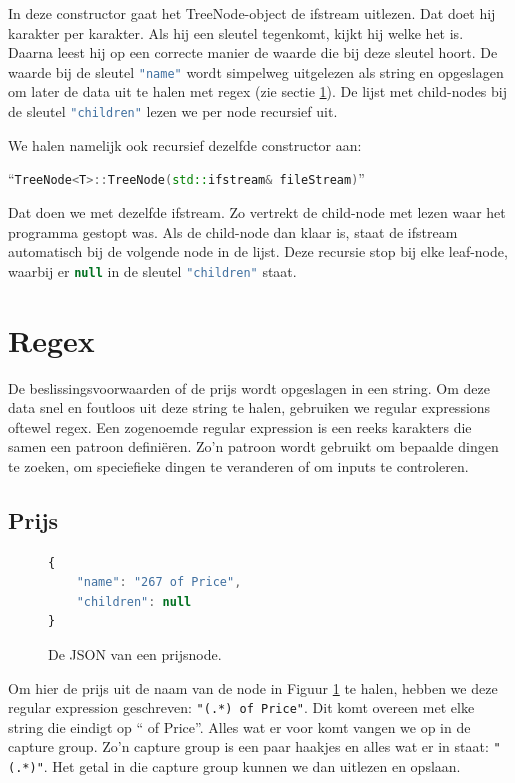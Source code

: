 In deze constructor gaat het TreeNode-object de ifstream uitlezen. Dat doet hij karakter per karakter. Als hij een sleutel tegenkomt, kijkt hij welke het is. Daarna leest hij op een correcte manier de waarde die bij deze sleutel hoort. De waarde bij de sleutel \lstinline[language=JavaScript]{"name"} wordt simpelweg uitgelezen als string en opgeslagen om later de data uit te halen met regex (zie sectie \ref{sec:regex}). De lijst met child-nodes bij de sleutel \lstinline[language=JavaScript]{"children"} lezen we per node recursief uit.

We halen namelijk ook recursief dezelfde constructor aan:
\nopagebreak

``\lstinline[language=C++]{TreeNode<T>::TreeNode(std::ifstream& fileStream)}''
\nopagebreak

Dat doen we met dezelfde ifstream. Zo vertrekt de child-node met lezen waar het programma gestopt was. Als de child-node dan klaar is, staat de ifstream automatisch bij de volgende node in de lijst.
Deze recursie stop bij elke leaf-node, waarbij er \lstinline[language=JavaScript]{null} in de sleutel \lstinline[language=JavaScript]{"children"} staat.


\section{Regex} \label{sec:regex}
De beslissingsvoorwaarden of de prijs wordt opgeslagen in een string. Om deze data snel en foutloos uit deze string te halen, gebruiken we regular expressions oftewel regex. Een zogenoemde regular expression is een reeks karakters die samen een patroon definiëren. Zo'n patroon wordt gebruikt om bepaalde dingen te zoeken, om speciefieke dingen te veranderen of om inputs te controleren.\cite{wiki:regex}

\newpage

\subsection{Prijs}
\begin{figure}[ht]
    \centering
    \begin{lstlisting}[language=JavaScript]
{
    "name": "267 of Price",
    "children": null
}
        \end{lstlisting}
    \caption{De JSON van een prijsnode.}
    \label{fig:json_leaf}
\end{figure}


Om hier de prijs uit de naam van de node in Figuur \ref{fig:json_leaf} te halen, hebben we deze regular expression geschreven: \lstinline{"(.*) of Price"}. Dit komt overeen met elke string die eindigt op `` of Price''. Alles wat er voor komt vangen we op in de capture group. Zo'n capture group is een paar haakjes en alles wat er in staat: \lstinline{"(.*)"}.\cite{Goyvaerts2017} Het getal in die capture group kunnen we dan uitlezen en opslaan.

